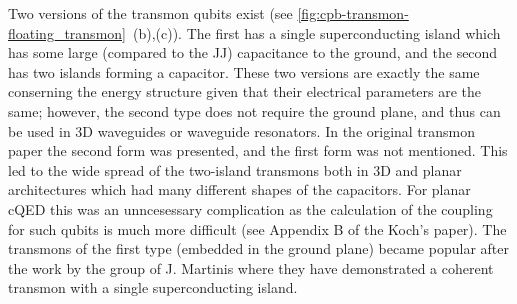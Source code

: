 Two versions of the transmon qubits exist (see \autoref{fig:cpb-transmon-floating_transmon}~(b),(c)). The first has a single superconducting island which has some large (compared to the JJ) capacitance to the ground, and the second has two islands forming a capacitor. These two versions are exactly the same conserning the energy structure given that their electrical parameters are the same; however, the second type does not require the ground plane, and thus can be used in 3D waveguides or waveguide resonators\cite{paik2011}. In the original transmon paper\cite{Koch2007} the second form was presented, and the first form was not mentioned. This led to the wide spread of the two-island transmons both in 3D and planar architectures which had many different shapes of the capacitors. For planar cQED this was an unncesessary complication as the calculation of the coupling for such qubits is much more difficult (see Appendix B of the Koch's paper). The transmons of the first type (embedded in the ground plane) became popular after the work\cite{barends2013} by the group of J. Martinis where they have demonstrated a coherent transmon with a single superconducting island.

